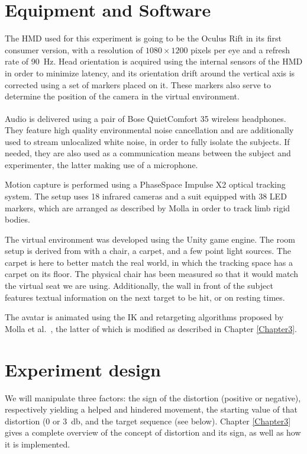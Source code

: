 \section{Equipment and Software}

The HMD used for this experiment is going to be the Oculus Rift in its first consumer version, with a resolution of $1080 \times 1200$ pixels per eye and a refresh rate of \SI{90}{\hertz}. Head orientation is acquired using the internal sensors of the HMD in order to minimize latency, and its orientation drift around the vertical axis is corrected using a set of markers placed on it. These markers also serve to determine the position of the camera in the virtual environment.

Audio is delivered using a pair of Bose\textsuperscript{\textregistered} QuietComfort 35 wireless headphones. They feature high quality environmental noise cancellation and are additionally used to stream unlocalized white noise, in order to fully isolate the subjects. If needed, they are also used as a communication means between the subject and experimenter, the latter making use of a microphone.

Motion capture is performed using a PhaseSpace Impulse X2 optical tracking system. The setup uses 18 infrared cameras and a suit equipped with 38 LED markers, which are arranged as described by Molla \cite{molla2016precise} in order to track limb rigid bodies.

The virtual environment was developed using the Unity game engine. The room setup is derived from \cite{debarba2017embodiment} with a chair, a carpet, and a few point light sources. The carpet is here to better match the real world, in which the tracking space has a carpet on its floor. The physical chair has been measured so that it would match the virtual seat we are using. Additionally, the wall in front of the subject features textual information on the next target to be hit, or on resting times.

The avatar is animated using the IK and retargeting algorithms proposed by Molla et al.\ \cite{molla2013singularity,molla2017egocentric}, the latter of which is modified as described in Chapter \ref{Chapter3}.

\section{Experiment design}

We will manipulate three factors: the sign of the distortion (positive or negative), respectively yielding a helped and hindered movement, the starting value of that distortion (\num{0} or \SI{3}{\decibel}, and the target sequence (see below). Chapter \ref{Chapter3} gives a complete overview of the concept of distortion and its sign, as well as how it is implemented.

